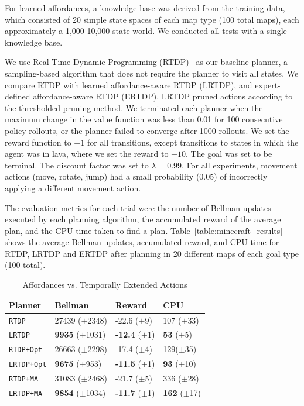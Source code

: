 \documentclass[letterpaper]{article}
\newcommand{\ra}[1]{\renewcommand{\arraystretch}{#1}} %
\begin{document}
For learned affordances, a knowledge base was derived from the training data, which consisted of 20 simple state spaces of each map type
(100 total maps), each approximately a 1,000-10,000 state world. We
conducted all tests with a single knowledge base. 

We use Real Time Dynamic Programming
(RTDP)~\cite{barto95} as our baseline planner, a sampling-based algorithm that does
not require the planner to visit all states. We compare RTDP with learned affordance-aware RTDP (LRTDP), and
expert-defined affordance-aware RTDP (ERTDP). LRTDP pruned actions according to the thresholded pruning method.
We terminated each planner when the maximum change in the value
function was less than 0.01 for 100 consecutive policy rollouts, or
the planner failed to converge after 1000 rollouts.  We set the reward
function to $-1$ for all transitions, except transitions to states in
which the agent was in lava, where we set the reward to $-10$. The goal was set to
be terminal. The discount factor was set to $\lambda = 0.99$. For all
experiments, movement actions (move, rotate, jump) had a small
probability (0.05) of incorrectly applying a different movement
action.

The evaluation metrics for each trial were the number of Bellman updates
executed by each planning algorithm, the accumulated reward
of the average plan, and the CPU time taken to find a
plan. Table~\ref{table:minecraft_results} shows the average Bellman
updates, accumulated reward, and CPU time for RTDP, LRTDP and ERTDP
after planning in 20 different maps of each goal type (100
total). 

\begin{table}[H]
\ra{1.25}
\begin{tabular}{@{}llll@{}}\toprule
Planner & Bellman & Reward & CPU \\ \midrule
\texttt{RTDP}   			&	27439 ($\pm$2348)		&	-22.6 ($\pm$9)		& 107 ($\pm$33) \\
\texttt{LRTDP} 			& 	{\bf 9935} ($\pm$1031)	&	{\bf -12.4} ($\pm$1)& {\bf 53} ($\pm$5) \\ \hline
\texttt{RTDP+Opt}  		&	26663 ($\pm$2298)		&	-17.4 ($\pm$4) 		& 129($\pm$35) \\
\texttt{LRTDP+Opt} 		& 	{\bf 9675} ($\pm$953)	&	{\bf -11.5} ($\pm$1)	&{\bf 93} ($\pm$10) \\ \hline
\texttt{RTDP+MA}  		&	31083 ($\pm$2468)		&	-21.7	 ($\pm$5)		&336 ($\pm$28) \\
\texttt{LRTDP+MA}  		& 	{\bf 9854} ($\pm$1034)	&	{\bf -11.7} ($\pm$1)	&{\bf 162} ($\pm$17) \\ %
\bottomrule
\end{tabular}
\caption{Affordances vs. Temporally Extended Actions}
\label{table:temp_ext_act_results}
\end{table}
\end{document}
